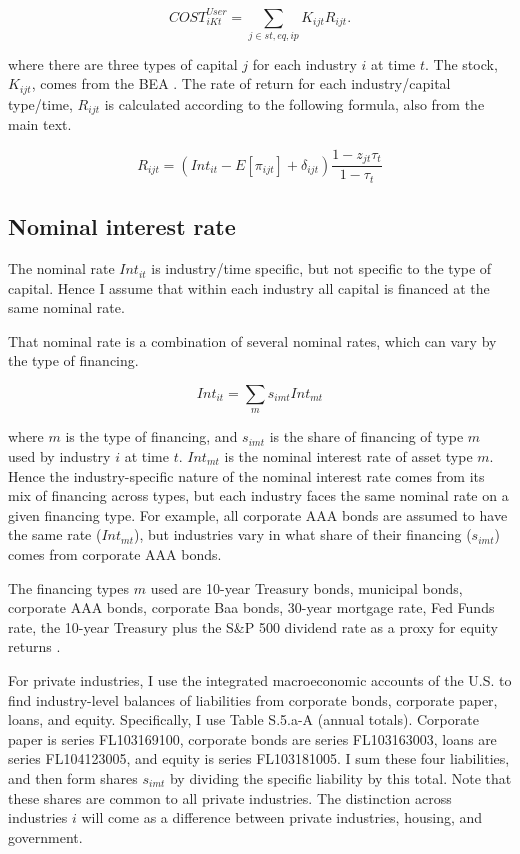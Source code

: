 \documentclass[11pt]{article}
\begin{document}
\begin{equation}
	COST^{User}_{iKt} = \sum_{j \in st,eq,ip} K_{ijt} R_{ijt}.
\end{equation}

where there are three types of capital $j$ for each industry $i$ at time $t$. The stock, $K_{ijt}$, comes from the BEA \citep{beacap,beagov}. The rate of return for each industry/capital type/time, $R_{ijt}$ is calculated according to the following formula, also from the main text.

\begin{equation}
	R_{ijt} = (Int_{it} - E[\pi_{ijt}] + \delta_{ijt})\frac{1-z_{jt} \tau_t}{1-\tau_t}
\end{equation}

\subsection{Nominal interest rate}
The nominal rate $Int_{it}$ is industry/time specific, but not specific to the type of capital. Hence I assume that within each industry all capital is financed at the same nominal rate.

That nominal rate is a combination of several nominal rates, which can vary by the type of financing. 

\begin{equation}
    Int_{it} = \sum_m s_{imt} Int_{mt}
\end{equation} 

where $m$ is the type of financing, and $s_{imt}$ is the share of financing of type $m$ used by industry $i$ at time $t$. $Int_{mt}$ is the nominal interest rate of asset type $m$. Hence the industry-specific nature of the nominal interest rate comes from its mix of financing across types, but each industry faces the same nominal rate on a given financing type. For example, all corporate AAA bonds are assumed to have the same rate ($Int_{mt}$), but industries vary in what share of their financing ($s_{imt}$) comes from corporate AAA bonds. 

The financing types $m$ used are 10-year Treasury bonds, municipal bonds, corporate AAA bonds, corporate Baa bonds, 30-year mortgage rate, Fed Funds rate, the 10-year Treasury plus the S\&P 500 dividend rate as a proxy for equity returns \citep{fedint,fredmort,moodys}.

For private industries, I use the integrated macroeconomic accounts of the U.S. \citep{beaimap} to find industry-level balances of liabilities from corporate bonds, corporate paper, loans, and equity. Specifically, I use Table S.5.a-A (annual totals). Corporate paper is series FL103169100, corporate bonds are series FL103163003, loans are series FL104123005, and equity is series FL103181005. I sum these four liabilities, and then form shares $s_{imt}$ by dividing the specific liability by this total. Note that these shares are common to all private industries. The distinction across industries $i$ will come as a difference between private industries, housing, and government. 
\end{document}
